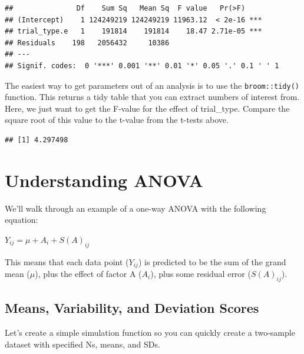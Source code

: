 \documentclass[
  oneside]{book}
\newenvironment{Shaded}{\begin{snugshade}}{\end{snugshade}}
\newcommand{\DecValTok}[1]{\textcolor[rgb]{0.00,0.00,0.81}{#1}}
\newcommand{\FunctionTok}[1]{\textcolor[rgb]{0.00,0.00,0.00}{#1}}
\newcommand{\NormalTok}[1]{#1}
\newcommand{\OtherTok}[1]{\textcolor[rgb]{0.56,0.35,0.01}{#1}}
\newcommand{\SpecialCharTok}[1]{\textcolor[rgb]{0.00,0.00,0.00}{#1}}
\begin{document}
\begin{verbatim}
##               Df    Sum Sq   Mean Sq  F value   Pr(>F)    
## (Intercept)    1 124249219 124249219 11963.12  < 2e-16 ***
## trial_type.e   1    191814    191814    18.47 2.71e-05 ***
## Residuals    198   2056432     10386                      
## ---
## Signif. codes:  0 '***' 0.001 '**' 0.01 '*' 0.05 '.' 0.1 ' ' 1
\end{verbatim}

The easiest way to get parameters out of an analysis is to use the \texttt{broom::tidy()} function. This returns a tidy table that you can extract numbers of interest from. Here, we just want to get the F-value for the effect of trial\_type. Compare the square root of this value to the t-value from the t-tests above.

\begin{Shaded}
\end{Shaded}

\begin{verbatim}
## [1] 4.297498
\end{verbatim}

\hypertarget{understanding-anova}{%
\section{Understanding ANOVA}\label{understanding-anova}}

We'll walk through an example of a one-way ANOVA with the following equation:

\(Y_{ij} = \mu + A_i + S(A)_{ij}\)

This means that each data point (\(Y_{ij}\)) is predicted to be the sum of the grand mean (\(\mu\)), plus the effect of factor A (\(A_i\)), plus some residual error (\(S(A)_{ij}\)).

\hypertarget{means-variability-and-deviation-scores}{%
\subsection{Means, Variability, and Deviation Scores}\label{means-variability-and-deviation-scores}}

Let's create a simple simulation function so you can quickly create a two-sample dataset with specified Ns, means, and SDs.
\end{document}
